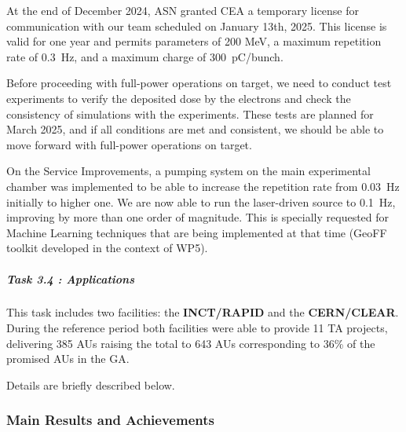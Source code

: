 {At the end of December 2024, ASN granted CEA a temporary license for communication with our team scheduled on January 13th, 2025. This license is valid for one year and permits parameters of 200 MeV, a maximum repetition rate of \SI{0.3}{Hz}, and a maximum charge of \SI{300}{\pico C/bunch}.

Before proceeding with full-power operations on target, we need to conduct test experiments to verify the deposited dose by the electrons and check the consistency of simulations with the experiments. These tests are planned for March 2025, and if all conditions are met and consistent, we should be able to move forward with full-power operations on target.


 On the Service Improvements, a pumping system on the main experimental chamber was implemented to be able to increase the repetition rate from \SI{0.03}{Hz} initially to higher one. We are now able to run the laser-driven source to \SI{0.1}{Hz}, improving by more than one order of magnitude. This is specially requested for Machine Learning techniques that are being implemented at that time (GeoFF toolkit developed in the context of WP5). 

\subparagraph{Task 3.4 : Applications} \mbox{}


This task includes two facilities: the {\bf INCT/RAPID} and the {\bf CERN/CLEAR}. During the reference period both facilities were able to provide 11 TA projects, delivering 385 AUs raising the total to 643 AUs corresponding to 36\% of the promised AUs in the GA. 

Details are briefly described below. 

\subsubsection*{Main Results and Achievements}


}
